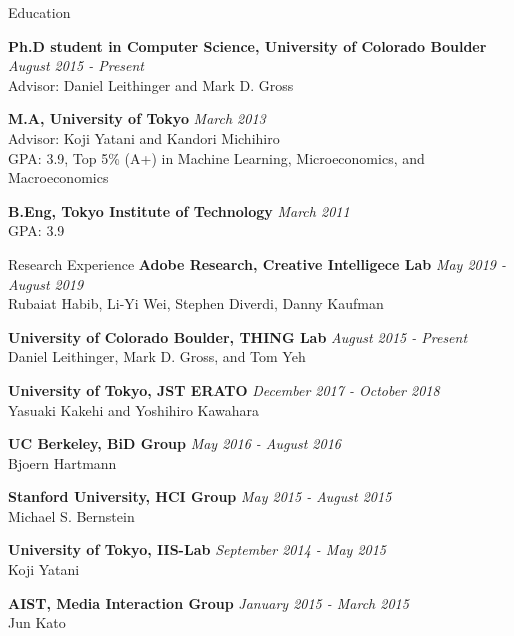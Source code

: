 \documentclass{resume} %
\begin{document}
\begin{rSection}{Education}

{\bf Ph.D student in Computer Science, University of Colorado Boulder} \hfill {\em August 2015 - Present} \\
Advisor: Daniel Leithinger and Mark D. Gross

{\bf M.A, University of Tokyo} \hfill {\em March 2013} \\
Advisor: Koji Yatani and Kandori Michihiro \\
GPA: 3.9, Top 5\% (A+) in Machine Learning, Microeconomics, and Macroeconomics

{\bf B.Eng, Tokyo Institute of Technology} \hfill {\em March 2011} \\
GPA: 3.9

\end{rSection}



\begin{rSection}{Research Experience}
{\bf Adobe Research, Creative Intelligece Lab} \hfill {\em May 2019 - August 2019} \\
Rubaiat Habib, Li-Yi Wei, Stephen Diverdi, Danny Kaufman

{\bf University of Colorado Boulder, THING Lab} \hfill {\em August 2015 - Present} \\
Daniel Leithinger, Mark D. Gross, and Tom Yeh

{\bf University of Tokyo, JST ERATO} \hfill {\em December 2017 - October 2018} \\
Yasuaki Kakehi and Yoshihiro Kawahara

{\bf UC Berkeley, BiD Group} \hfill {\em May 2016 - August 2016} \\
Bjoern Hartmann

{\bf Stanford University, HCI Group} \hfill {\em May 2015 - August 2015} \\
Michael S. Bernstein

{\bf University of Tokyo, IIS-Lab} \hfill {\em September 2014 - May 2015} \\
Koji Yatani

{\bf AIST, Media Interaction Group} \hfill {\em January 2015 - March 2015} \\
Jun Kato

\end{rSection}
\end{document}
